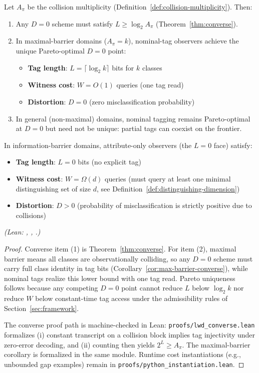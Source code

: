 \begin{theorem}\label{thm:lwd-optimal}
Let $A_\pi$ be the collision multiplicity (Definition~\ref{def:collision-multiplicity}). Then:
\begin{enumerate}
\item Any $D=0$ scheme must satisfy $L \ge \log_2 A_\pi$ (Theorem~\ref{thm:converse}).
\item In maximal-barrier domains ($A_\pi = k$), nominal-tag observers achieve the unique Pareto-optimal $D=0$ point:
\begin{itemize}
\item \textbf{Tag length}: $L = \lceil \log_2 k \rceil$ bits for $k$ classes
\item \textbf{Witness cost}: $W = O(1)$ queries (one tag read)
\item \textbf{Distortion}: $D = 0$ (zero misclassification probability)
\end{itemize}
\item In general (non-maximal) domains, nominal tagging remains Pareto-optimal at $D=0$ but need not be unique: partial tags can coexist on the frontier.
\end{enumerate}

In information-barrier domains, attribute-only observers (the $L=0$ face) satisfy:
\begin{itemize}
\item \textbf{Tag length}: $L = 0$ bits (no explicit tag)
\item \textbf{Witness cost}: $W = \Omega(d)$ queries (must query at least one minimal distinguishing set of size $d$, see Definition~\ref{def:distinguishing-dimension})
\item \textbf{Distortion}: $D > 0$ (probability of misclassification is strictly positive due to collisions)
\end{itemize}
\textit{(Lean: ,
,
.)}
\end{theorem}

\begin{proof}
Converse item (1) is Theorem~\ref{thm:converse}. For item (2), maximal barrier means all classes are observationally colliding, so any $D=0$ scheme must carry full class identity in tag bits (Corollary~\ref{cor:max-barrier-converse}), while nominal tags realize this lower bound with one tag read. Pareto uniqueness follows because any competing $D=0$ point cannot reduce $L$ below $\log_2 k$ nor reduce $W$ below constant-time tag access under the admissibility rules of Section~\ref{sec:framework}.

The converse proof path is machine-checked in Lean: \texttt{proofs/lwd\_converse.lean} formalizes (i) constant transcript on a collision block implies tag injectivity under zero-error decoding, and (ii) counting then yields $2^L \ge A_\pi$. The maximal-barrier corollary is formalized in the same module. Runtime cost instantiations (e.g., unbounded gap examples) remain in \texttt{proofs/python\_instantiation.lean}.
\end{proof}

